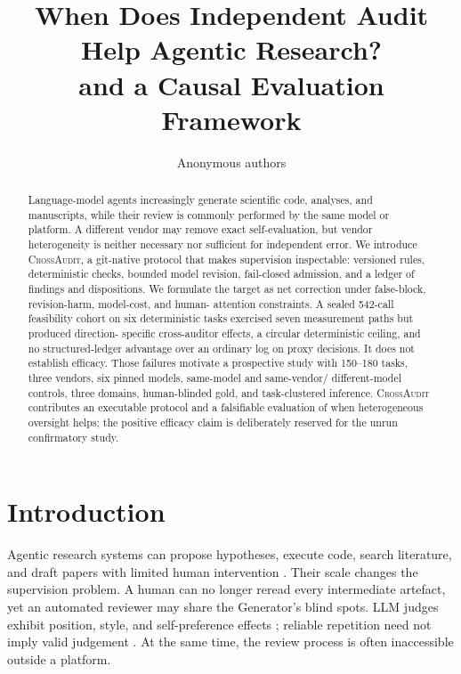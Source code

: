 \documentclass[10pt]{article}
\title{When Does Independent Audit Help Agentic Research?\\
\ca{} and a Causal Evaluation Framework}
\author{Anonymous authors}
\date{}
\newcommand{\ca}{\textsc{CrossAudit}}
\begin{document}
\maketitle
\vspace{-1.3em}
\begin{center}
\end{center}

\begin{abstract}
Language-model agents increasingly generate scientific code, analyses, and
manuscripts, while their review is commonly performed by the same model or
platform. A different vendor may remove exact self-evaluation, but vendor
heterogeneity is neither necessary nor sufficient for independent error. We
introduce \ca{}, a git-native protocol that makes supervision inspectable:
versioned rules, deterministic checks, bounded model revision, fail-closed
admission, and a ledger of findings and dispositions. We formulate the target
as net correction under false-block, revision-harm, model-cost, and human-
attention constraints. A sealed 542-call feasibility cohort on six
deterministic tasks exercised seven measurement paths but produced direction-
specific cross-auditor effects, a circular deterministic ceiling, and no
structured-ledger advantage over an ordinary log on proxy decisions. It does
not establish efficacy. Those failures motivate a prospective study with
150--180 tasks, three vendors, six pinned models, same-model and same-vendor/
different-model controls, three domains, human-blinded gold, and task-clustered
inference. \ca{} contributes an executable protocol and a falsifiable
evaluation of when heterogeneous oversight helps; the positive efficacy claim
is deliberately reserved for the unrun confirmatory study.
\end{abstract}

\section{Introduction}

Agentic research systems can propose hypotheses, execute code, search
literature, and draft papers with limited human intervention
\cite{lu2024,lu2026,gottweis2026}. Their scale changes the supervision problem.
A human can no longer reread every intermediate artefact, yet an automated
reviewer may share the Generator's blind spots. LLM judges exhibit position,
style, and self-preference effects \cite{zheng2023,panickssery2024}; reliable
repetition need not imply valid judgement \cite{norman2026}. At the same time,
the review process is often inaccessible outside a platform.
\end{document}
